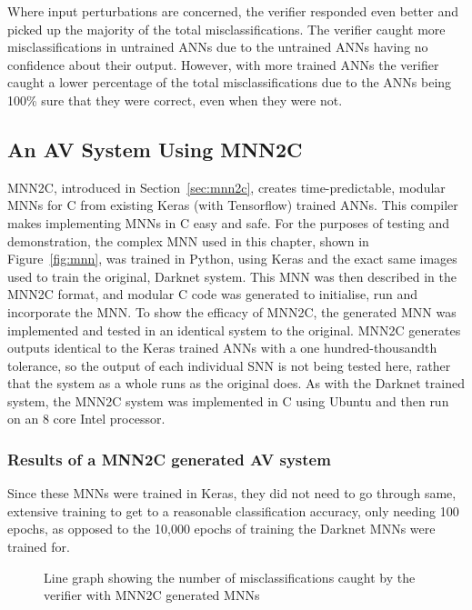 Where input perturbations are concerned, the verifier responded even better and picked up the majority of the total misclassifications.
The verifier caught more misclassifications in untrained \acp{ANN} due to the untrained \acp{ANN} having no confidence about their output.
However, with more trained \acp{ANN} the verifier caught a lower percentage of the total misclassifications due to the \acp{ANN} being 100\% sure that they were correct, even when they were not.

\subsection{An \ac{AV} System Using \acf{MNN2C}}
\ac{MNN2C}, introduced in Section~\ref{sec:mnn2c}, creates time-predictable, modular \acfp{MNN} for C from existing Keras (with Tensorflow) trained \acp{ANN}. 
This compiler makes implementing \acfp{MNN} in C easy and safe.
For the purposes of testing and demonstration, the complex \ac{MNN} used in this chapter, shown in Figure~\ref{fig:mnn}, was trained in Python, using Keras and the exact same images used to train the original, Darknet system.
This \ac{MNN} was then described in the \ac{MNN2C} format, and modular C code was generated to initialise, run and incorporate the \ac{MNN}.
To show the efficacy of \ac{MNN2C}, the generated \ac{MNN} was implemented and tested in an identical system to the original. 
\ac{MNN2C} generates outputs identical to the Keras trained \acp{ANN} with a one hundred-thousandth tolerance, so the output of each individual \ac{SNN} is not being tested here, rather that the system as a whole runs as the original does.
As with the Darknet trained system, the \ac{MNN2C} system was implemented in C using Ubuntu and then run on an 8 core Intel processor.

\subsubsection{Results of a \ac{MNN2C} generated \ac{AV} system}
Since these \acp{MNN} were trained in Keras, they did not need to go through same, extensive training to get to a reasonable classification accuracy, only needing 100 epochs, as opposed to the 10,000 epochs of training the Darknet \acp{MNN} were trained for.

\begin{figure}[H]
	\centering
	\scalebox{0.9}{}
	\caption{Line graph showing the number of misclassifications caught by the verifier with \ac{MNN2C} generated \acp{MNN} \label{fig:sign-graphboth-mnn2c}}
\end{figure}

